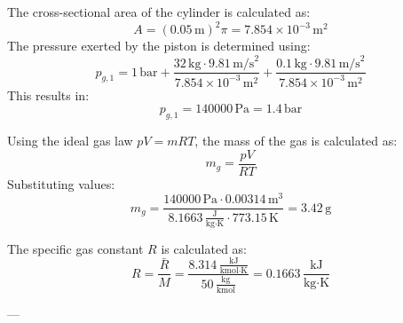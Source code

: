 The cross-sectional area of the cylinder is calculated as:  
\[
A = (0.05 \, \text{m})^2 \pi = 7.854 \times 10^{-3} \, \text{m}^2
\]  
The pressure exerted by the piston is determined using:  
\[
p_{g,1} = 1 \, \text{bar} + \frac{32 \, \text{kg} \cdot 9.81 \, \text{m/s}^2}{7.854 \times 10^{-3} \, \text{m}^2} + \frac{0.1 \, \text{kg} \cdot 9.81 \, \text{m/s}^2}{7.854 \times 10^{-3} \, \text{m}^2}
\]  
This results in:  
\[
p_{g,1} = 140000 \, \text{Pa} = 1.4 \, \text{bar}
\]  

Using the ideal gas law \( pV = mRT \), the mass of the gas is calculated as:  
\[
m_g = \frac{pV}{RT}
\]  
Substituting values:  
\[
m_g = \frac{140000 \, \text{Pa} \cdot 0.00314 \, \text{m}^3}{8.1663 \, \frac{\text{J}}{\text{kg·K}} \cdot 773.15 \, \text{K}} = 3.42 \, \text{g}
\]  

The specific gas constant \( R \) is calculated as:  
\[
R = \frac{\bar{R}}{M} = \frac{8.314 \, \frac{\text{kJ}}{\text{kmol·K}}}{50 \, \frac{\text{kg}}{\text{kmol}}} = 0.1663 \, \frac{\text{kJ}}{\text{kg·K}}
\]  

---